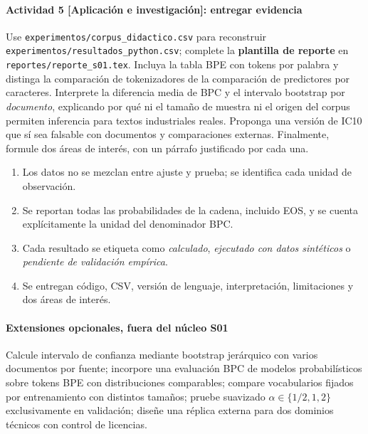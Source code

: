 \paragraph{Actividad 5 [Aplicación e investigación]: entregar evidencia}
Use \nolinkurl{experimentos/corpus_didactico.csv} para reconstruir
\nolinkurl{experimentos/resultados_python.csv}; complete la
\textbf{plantilla de reporte} en \nolinkurl{reportes/reporte_s01.tex}.
Incluya la tabla BPE con tokens por palabra y distinga la comparación
de tokenizadores de la comparación de predictores por caracteres.
Interprete la diferencia media de BPC y el intervalo bootstrap por
\emph{documento}, explicando por qué ni el tamaño de muestra ni el origen
del corpus permiten inferencia para textos industriales reales.
Proponga una versión de IC10 que sí sea falsable con documentos y
comparaciones externas. Finalmente, formule dos áreas de interés,
con un párrafo justificado por cada una.
\begin{verificacion}
\begin{enumerate}
\item Los datos no se mezclan entre ajuste y prueba; se identifica cada
unidad de observación.
\item Se reportan todas las probabilidades de la cadena, incluido EOS,
y se cuenta explícitamente la unidad del denominador BPC.
\item Cada resultado se etiqueta como \emph{calculado}, \emph{ejecutado
con datos sintéticos} o \emph{pendiente de validación empírica}.
\item Se entregan código, CSV, versión de lenguaje, interpretación,
limitaciones y dos áreas de interés.
\end{enumerate}
\end{verificacion}
\paragraph{Extensiones opcionales, fuera del núcleo S01}
Calcule intervalo de confianza mediante bootstrap jerárquico con varios
documentos por fuente; incorpore una evaluación BPC de modelos probabilísticos sobre tokens
BPE con distribuciones comparables; compare
vocabularios fijados por entrenamiento con distintos tamaños; pruebe
suavizado $\alpha\in\{1/2,1,2\}$ exclusivamente en validación; diseñe una
réplica externa para dos dominios técnicos con control de licencias.




